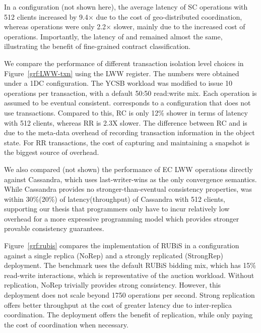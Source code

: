 In a  configuration (not shown here), the average latency of SC
operations with 512 clients increased by 9.4$\times$ due to the cost of
geo-distributed coordination, whereas \name operations were only 2.2$\times$
slower, mainly due to the increased cost of 
operations. Importantly, the latency of  and 
remained almost the same, illustrating the benefit of fine-grained
contract classification.

We compare the performance of different transaction isolation level choices
in Figure~\ref{grf:LWW-txn} using the LWW register. The numbers were
obtained under a 1DC configuration. The YCSB workload was modified to issue
10 operations per transaction, with a default 50:50 read:write mix. Each
operation is assumed to be eventual consistent.  corresponds to a
configuration that does not use transactions. Compared to this, RC is only
12\% shower in terms of latency with 512 clients, whereas RR is 2.3X
slower. The difference between RC and  is due to the meta-data
overhead of recording transaction information in the object state. For RR
transactions, the cost of capturing and maintaining a snapshot is the
biggest source of overhead.

We also compared (not shown) the performance of EC LWW operations directly
against Cassandra, which uses last-writer-wins as the only convergence
semantics. While Cassandra provides no stronger-than-eventual consistency
properties, \name was within 30\%(20\%) of latency(throughput) of Cassandra
with 512 clients, supporting our thesis that programmers only have to incur
relatively low overhead for a more expressive programming model which
provides stronger provable consistency guarantees.

Figure~\ref{grf:rubis} compares the \name implementation of RUBiS in a
 configuration against a single replica ({\sf NoRep}) and a strongly
replicated ({\sf StrongRep})  deployment. The benchmark uses the
default RUBiS bidding mix, which has 15\% read-write interactions, which is
representative of the auction workload.  Without replication, {\sf NoRep}
trivially provides strong consistency. However, this deployment does not
scale beyond 1750 operations per second. Strong replication offers better
throughput at the cost of greater latency due to inter-replica
coordination. The \name deployment offers the benefit of replication, while
only paying the cost of coordination when necessary.

